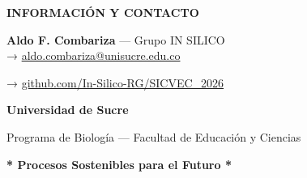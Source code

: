 \documentclass[12pt,a4paper]{article}
\begin{document}
\begin{center}
  \textcolor{verdemid}{\textbf{INFORMACIÓN Y CONTACTO}}

  \vspace{0.15cm}

  \small
  \textbf{Aldo F. Combariza} — Grupo IN SILICO \\
  → \href{mailto:aldo.combariza@unisucre.edu.co}{\textcolor{verdemid}{aldo.combariza@unisucre.edu.co}} \\

  \vspace{0.1cm}

  → \href{https://github.com/In-Silico-RG/SICVEC_2026}{\textcolor{verdemid}{github.com/In-Silico-RG/SICVEC\_2026}} \\

  \vspace{0.15cm}

  \textcolor{verdeosc}{\textbf{Universidad de Sucre}}

  Programa de Biología — Facultad de Educación y Ciencias
\end{center}

\vspace{0.3cm}


\begin{center}
  \textcolor{dorado}{\textbf{* Procesos Sostenibles para el Futuro *}}
\end{center}
\end{document}
